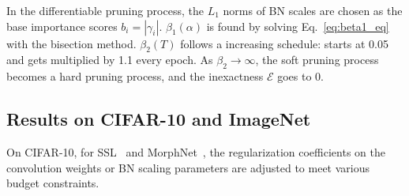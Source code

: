 \documentclass[runningheads]{llncs}
\newcommand{\inexactness}{\mathcal{E}}
\begin{document}
  In the differentiable pruning process, the $L_1$ norms of BN scales are chosen as the base importance scores $b_i =|\gamma_i|$. $\beta_1(\alpha)$ is found by solving Eq.~\ref{eq:beta1_eq} with the bisection method. 
  $\beta_2(T)$ follows a increasing schedule: starts at 0.05 and gets multiplied by 1.1 every epoch. As $\beta_2 \to \infty$, the soft pruning process becomes a hard pruning process, and the inexactness $\inexactness$ goes to $0$.
  
  \subsection{Results on CIFAR-10 and ImageNet}
  
  On CIFAR-10,
  for SSL~\cite{grouplasso} and MorphNet~\cite{morphnet}, the regularization coefficients on the convolution weights or BN scaling parameters are adjusted to meet various budget constraints.
  
\end{document}
